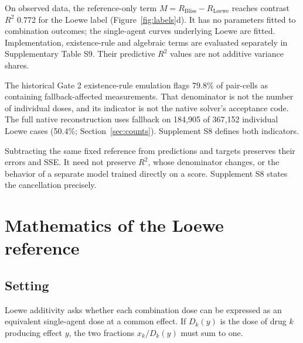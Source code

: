 \documentclass[11pt]{article}
\begin{document}
On observed data, the reference-only term $M=R_{\mathrm{Bliss}}-R_{\mathrm{Loewe}}$ reaches contrast $R^2$ 0.772 for the Loewe label (Figure~\ref{fig:labels}d). It has no parameters fitted to combination outcomes; the single-agent curves underlying Loewe are fitted. Implementation, existence-rule and algebraic terms are evaluated separately in Supplementary Table S9. Their predictive $R^2$ values are not additive variance shares.

The historical Gate 2 existence-rule emulation flags 79.8\% of pair-cells as containing fallback-affected measurements. That denominator is not the number of individual doses, and its indicator is not the native solver's acceptance code. The full native reconstruction uses fallback on 184,905 of 367,152 individual Loewe cases (50.4\%; Section~\ref{sec:counts}). Supplement S8 defines both indicators.


Subtracting the same fixed reference from predictions and targets preserves their errors and SSE. It need not preserve $R^2$, whose denominator changes, or the behavior of a separate model trained directly on a score. Supplement S8 states the cancellation precisely.

\section{Mathematics of the Loewe reference}\label{sec:loewe}
\subsection{Setting}\label{sec:setting}
Loewe additivity asks whether each combination dose can be expressed as an equivalent single-agent dose at a common effect. If $D_k(y)$ is the dose of drug $k$ producing effect $y$, the two fractions $x_k/D_k(y)$ must sum to one.
\end{document}

